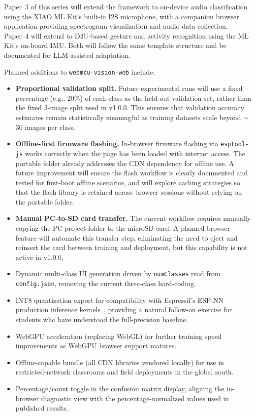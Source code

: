 \documentclass[11pt]{article}
\begin{document}
Paper~3 of this series will extend the framework to on-device audio classification
using the XIAO ML Kit's built-in I2S microphone, with a companion browser application
providing spectrogram visualization and audio data collection. Paper~4 will extend to
IMU-based gesture and activity recognition using the ML Kit's on-board IMU. Both will
follow the same template structure and be documented for LLM-assisted adaptation.

Planned additions to \texttt{webmcu-vision-web} include:

\begin{itemize}
  \item \textbf{Proportional validation split.} Future experimental runs will use a
        fixed percentage (e.g., 20\%) of each class as the held-out validation set,
        rather than the fixed 3-image split used in v1.0.0. This ensures that
        validation accuracy estimates remain statistically meaningful as training
        datasets scale beyond $\sim$30 images per class.

  \item \textbf{Offline-first firmware flashing.} In-browser firmware flashing via
        \texttt{esptool-js} works correctly when the page has been loaded with internet
        access. The portable folder already addresses the CDN dependency for offline use.
        A future improvement will ensure the flash workflow is clearly documented and
        tested for first-boot offline scenarios, and will explore caching strategies
        so that the flash library is retained across browser sessions without relying
        on the portable folder.

  \item \textbf{Manual PC-to-SD card transfer.} The current workflow requires
        manually copying the PC project folder to the microSD card. A planned browser
        feature will automate this transfer step, eliminating the need to eject and
        reinsert the card between training and deployment, but this capability is not
        active in v1.0.0.
  \item Dynamic multi-class UI generation driven by \texttt{numClasses} read from
        \texttt{config.json}, removing the current three-class hard-coding.
  \item INT8 quantization export for compatibility with Espressif's ESP-NN production
        inference kernels~\cite{espressifespdl}, providing a natural follow-on exercise
        for students who have understood the full-precision baseline.
  \item WebGPU acceleration (replacing WebGL) for further training speed improvements
        as WebGPU browser support matures.
  \item Offline-capable bundle (all CDN libraries vendored locally) for use in
        restricted-network classrooms and field deployments in the global south.
  \item Percentage/count toggle in the confusion matrix display, aligning the in-browser
        diagnostic view with the percentage-normalized values used in published results.
\end{itemize}
\end{document}
